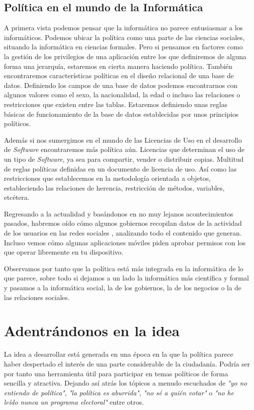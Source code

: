 \subsection{Política en el mundo de la Informática}

A primera vista podemos pensar que la informática no parece entusiasmar a los informáticos. Podemos ubicar la política como una parte de las ciencias sociales, situando la informática en ciencias formales. Pero si pensamos en factores como la gestión de los privilegios de una aplicación entre los que definiremos de alguna forma una jerarquía, estaremos en cierta manera haciendo política. También encontraremos características políticas en el diseño relacional de una base de datos. Definiendo los campos de una base de datos podemos encontrarnos con algunos valores como el sexo, la nacionalidad, la edad o incluso las relaciones o restricciones que existen entre las tablas. Estaremos definiendo unas reglas básicas de funcionamiento de la base de datos establecidas por unos principios políticos.

Además si nos sumergimos en el mundo de las Licencias de Uso en el desarrollo de \textit{Software} encontraremos más política aún. Licencias que determinan el uso de un tipo de \textit{Software}, ya sea para compartir, vender o distribuir copias. Multitud de reglas políticas definidas en un documento de licencia de uso. Así como las restricciones que establecemos en la metodología orientada a objetos, estableciendo las relaciones de herencia, restricción de métodos, variables, etcétera.

Regresando a la actualidad y basándonos en no muy lejanos acontecimientos pasados, habremos oído cómo algunos gobiernos recopilan datos de la actividad de los usuarios en las redes sociales \cite{ref:NSAData}, analizando todo el contenido que generan. Incluso vemos cómo algunas aplicaciones móviles piden aprobar permisos con los que operar libremente en tu dispositivo.

Observamos por tanto que la política está más integrada en la informática de lo que parece, sobre todo si dejamos a un lado la informática más científica y formal y pasamos a la informática social, la de los gobiernos, la de los negocios o la de las relaciones sociales.


\section{Adentrándonos en la idea}

La idea a desarrollar está generada en una época en la que la política parece haber despertado el interés de una parte considerable de la ciudadanía. Podría ser por tanto una herramienta útil para participar en temas políticos de forma sencilla y atractiva. Dejando así atrás los tópicos a menudo escuchados de \textit{"yo no entiendo de política"}, \textit{"la política es aburrida"}, \textit{"no sé a quién votar"} o \textit{"no he leído nunca un programa electoral"} entre otros.

